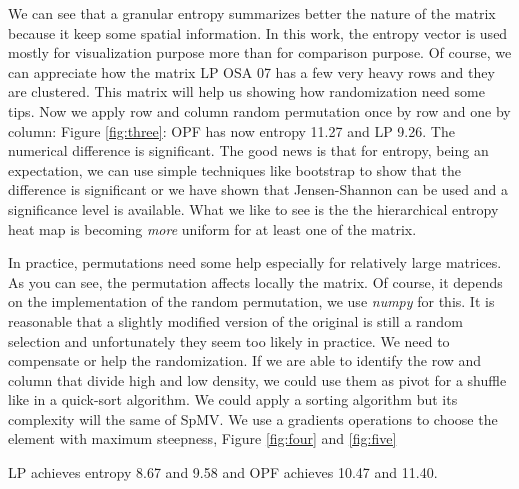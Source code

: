 \documentclass[manuscript,screen]{acmart}
\begin{document}

We can see that a granular entropy summarizes better the nature of the
matrix because it keep some spatial information. In this work, the
entropy vector is used mostly for visualization purpose more than for
comparison purpose. Of course, we can appreciate how the matrix LP OSA
07 has a few very heavy rows and they are clustered. This matrix will
help us showing how randomization need some tips. Now we apply row and
column random permutation once by row and one by column: Figure
\ref{fig:three}: OPF has now entropy 11.27 and LP 9.26. The numerical
difference is significant. The good news is that for entropy, being an
expectation, we can use simple techniques like bootstrap to show that
the difference is significant or we have shown that Jensen-Shannon can
be used and a significance level is available. What we like to see is
the the hierarchical entropy heat map is becoming {\em more} uniform
for at least one of the matrix.


In practice, permutations need some help especially for relatively
large matrices. As you can see, the permutation affects locally the
matrix. Of course, it depends on the implementation of the random
permutation, we use {\em numpy} for this. It is reasonable that a
slightly modified version of the original is still a random selection
and unfortunately they seem too likely in practice. We need to
compensate or help the randomization. If we are able to identify the
row and column that divide high and low density, we could use them as
pivot for a shuffle like in a quick-sort algorithm. We could apply a
sorting algorithm but its complexity will the same of SpMV. We use a
gradients operations to choose the element with maximum steepness,
Figure \ref{fig:four} and \ref{fig:five}

LP achieves entropy 8.67 and 9.58 and OPF achieves 10.47 and 11.40.

\end{document}
